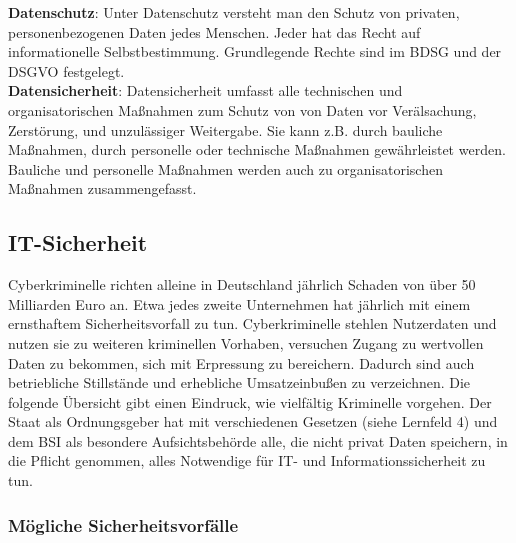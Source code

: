 \documentclass[a4paper, 12pt]{report}
\begin{document}
\textbf{Datenschutz}: Unter Datenschutz versteht man den Schutz von privaten,
personenbezogenen Daten jedes Menschen. Jeder hat das Recht auf informationelle
Selbstbestimmung. Grundlegende Rechte sind im BDSG und der DSGVO festgelegt. \\

\textbf{Datensicherheit}: Datensicherheit umfasst alle technischen und
organisatorischen Maßnahmen zum Schutz von von Daten vor Verälsachung,
Zerstörung, und unzulässiger Weitergabe. Sie kann z.B. durch bauliche Maßnahmen,
durch personelle oder technische Maßnahmen gewährleistet werden. Bauliche und
personelle Maßnahmen werden auch zu organisatorischen Maßnahmen zusammengefasst.

\subsection{IT-Sicherheit}

Cyberkriminelle richten alleine in Deutschland jährlich Schaden von über 50
Milliarden Euro an. Etwa jedes zweite Unternehmen hat jährlich mit einem
ernsthaftem Sicherheitsvorfall zu tun. Cyberkriminelle stehlen Nutzerdaten und
nutzen sie zu weiteren kriminellen Vorhaben, versuchen Zugang zu wertvollen
Daten zu bekommen, sich mit Erpressung zu bereichern. Dadurch sind auch
betriebliche Stillstände und erhebliche Umsatzeinbußen zu verzeichnen. Die
folgende Übersicht gibt einen Eindruck, wie vielfältig Kriminelle vorgehen. Der
Staat als Ordnungsgeber hat mit verschiedenen Gesetzen (siehe Lernfeld 4) und
dem BSI als besondere Aufsichtsbehörde alle, die nicht privat Daten speichern,
in die Pflicht genommen, alles Notwendige für IT- und Informationssicherheit zu
tun.

\subsubsection{Mögliche Sicherheitsvorfälle}
\end{document}

